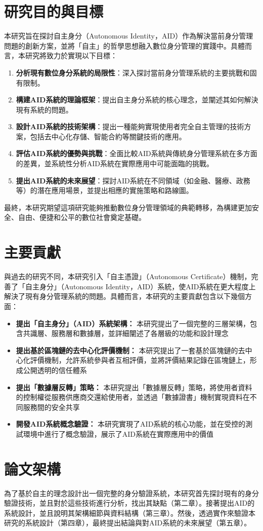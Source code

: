 \section{研究目的與目標}
本研究旨在探討自主身分（Autonomous Identity，AID）作為解決當前身分管理問題的創新方案，並將「自主」的哲學思想融入數位身分管理的實踐中。具體而言，本研究將致力於實現以下目標：
\begin{enumerate}
  \item \textbf{分析現有數位身分系統的局限性}：深入探討當前身分管理系統的主要挑戰和固有限制。
  \item \textbf{構建AID系統的理論框架}：提出自主身分系統的核心理念，並闡述其如何解決現有系統的問題。
  \item \textbf{設計AID系統的技術架構}：提出一種能夠實現使用者完全自主管理的技術方案，包括去中心化存儲、智能合約等關鍵技術的應用。
  \item \textbf{評估AID系統的優勢與挑戰}：全面比較AID系統與傳統身分管理系統在多方面的差異，並系統性分析AID系統在實際應用中可能面臨的挑戰。
  \item \textbf{提出AID系統的未來展望}：探討AID系統在不同領域（如金融、醫療、政務等）的潛在應用場景，並提出相應的實施策略和路線圖。
\end{enumerate}
最終，本研究期望這項研究能夠推動數位身分管理領域的典範轉移，為構建更加安全、自由、便捷和公平的數位社會奠定基礎。
\section{主要貢獻}
與過去的研究不同，本研究引入「自主憑證」（Autonomous Certificate）\cite{NTU202102846}機制，完善了「自主身分」（Autonomous Identity，AID）系統\cite{ntu-lin2014autonomous}，使AID系統在更大程度上解決了現有身分管理系統的問題。具體而言，本研究的主要貢獻包含以下幾個方面：
\begin{itemize}
  \item \textbf{提出「自主身分」（AID）系統架構：} 本研究提出了一個完整的三層架構，包含共識層、服務層和數據層，並詳細闡述了各層級的功能和設計理念
  \item \textbf{提出基於區塊鏈的去中心化評價機制：} 本研究提出了一套基於區塊鏈的去中心化評價機制，允許系統參與者互相評價，並將評價結果記錄在區塊鏈上，形成公開透明的信任體系
  \item \textbf{提出「數據層反轉」策略：} 本研究提出「數據層反轉」策略，將使用者資料的控制權從服務供應商交還給使用者，並透過「數據證書」機制實現資料在不同服務間的安全共享
  \item \textbf{開發AID系統概念驗證：} 本研究實現了AID系統的核心功能，並在受控的測試環境中進行了概念驗證，展示了AID系統在實際應用中的價值
\end{itemize}
\section{論文架構}
為了基於自主的理念設計出一個完整的身分驗證系統，本研究首先探討現有的身分驗證技術，並且對於這些技術進行分析，找出其缺點（第二章）。接著提出AID的系統設計，並且說明其架構細節與資料結構（第三章）。然後，透過實作來驗證本研究的系統設計（第四章），最終提出結論與對AID系統的未來展望（第五章）。